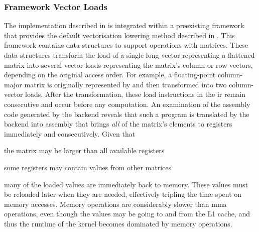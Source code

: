 \documentclass[\main/thesis.tex]{subfiles}
\begin{document}
\subsubsection{Framework Vector Loads}
The implementation described in  is integrated within a preexisting framework that provides the default vectorisation \gls{lowering} method described in .
This framework contains data structures to support operations with matrices.
These data structures transform the load of a single long vector representing a flattened matrix into several vector loads representing the matrix's column or row vectors, depending on the original access order.
For example, a floating-point column-major matrix  is originally represented by  and then transformed into two  column-vector loads.
After the transformation, these load instructions in the \gls{ir} remain consecutive and occur before any computation.
An examination of the assembly code generated by the backend reveals that such a program is translated by the backend into assembly that brings \emph{all} of the matrix's elements to registers immediately and consecutively.
Given that
\begin{enumerate*}[itemjoin={{; }}, itemjoin*={{; or }}, label=(\arabic*), after={,}]
  \item the matrix may be larger than all available registers
  \item some registers may contain values from other matrices
\end{enumerate*}
many of the loaded values are immediately  back to memory.
These values must be reloaded later when they are needed, effectively tripling the time spent on memory accesses.
Memory operations are considerably slower than \gls{mma} operations, even though the values may be going to and from the L1 cache, and thus the runtime of the kernel becomes dominated by memory operations.
\end{document}
